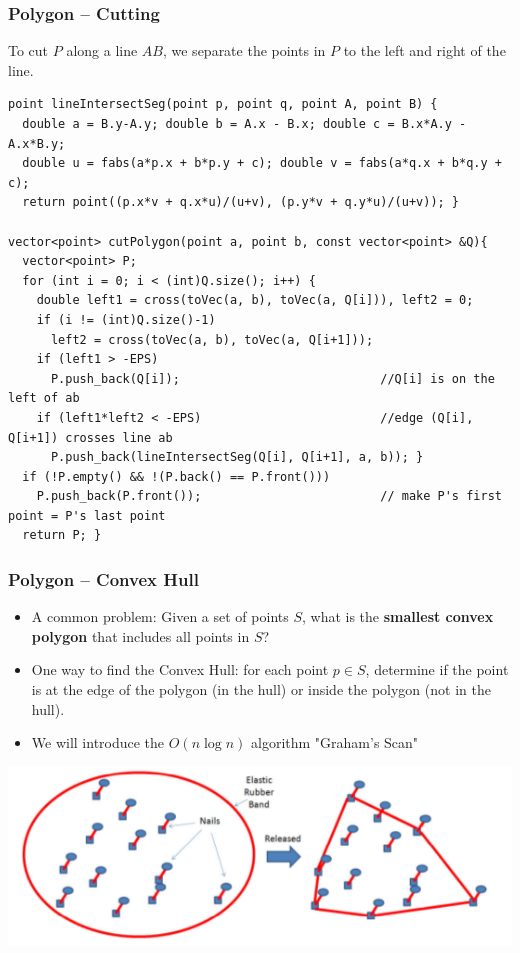 \begin{frame}[fragile]
  \frametitle{Polygon -- Cutting}
  {\smaller
    \begin{block}{}
      To cut $P$ along a line $AB$, we separate the points in $P$ to the
      left and right of the line.
    \end{block}

{\smaller
    \begin{exampleblock}{}
\begin{verbatim}
point lineIntersectSeg(point p, point q, point A, point B) {
  double a = B.y-A.y; double b = A.x - B.x; double c = B.x*A.y - A.x*B.y;
  double u = fabs(a*p.x + b*p.y + c); double v = fabs(a*q.x + b*q.y + c);
  return point((p.x*v + q.x*u)/(u+v), (p.y*v + q.y*u)/(u+v)); }

vector<point> cutPolygon(point a, point b, const vector<point> &Q){
  vector<point> P;
  for (int i = 0; i < (int)Q.size(); i++) {
    double left1 = cross(toVec(a, b), toVec(a, Q[i])), left2 = 0;
    if (i != (int)Q.size()-1)
      left2 = cross(toVec(a, b), toVec(a, Q[i+1]));
    if (left1 > -EPS)
      P.push_back(Q[i]);                            //Q[i] is on the left of ab
    if (left1*left2 < -EPS)                         //edge (Q[i], Q[i+1]) crosses line ab
      P.push_back(lineIntersectSeg(Q[i], Q[i+1], a, b)); }
  if (!P.empty() && !(P.back() == P.front()))
    P.push_back(P.front());                         // make P's first point = P's last point
  return P; }
\end{verbatim}
    \end{exampleblock}}
  }
\end{frame}

\begin{frame}
  \frametitle{Polygon -- Convex Hull}

  \begin{itemize}
    \item A common problem: Given a set of points $S$, what is the {\bf smallest convex polygon} that includes all points in $S$?\bigskip

    \item One way to find the Convex Hull: for each point $p \in S$, determine if the point is at the edge of the polygon (in the hull) or inside the polygon (not in the hull).\bigskip

    \item We will introduce the $O(n\log n)$ algorithm "Graham's Scan"
  \end{itemize}

    \begin{center}
      \includegraphics[width=.7\textwidth]{../img/convexhull_halim}
    \end{center}
\end{frame}

